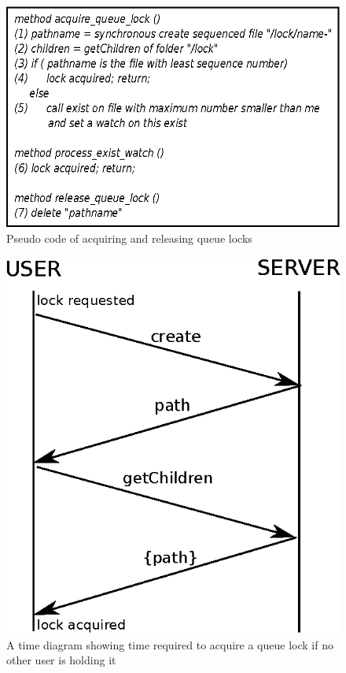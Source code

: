 \begin{figure}[h]
\centering
\includegraphics[scale=0.85]{img/queue_lock_pseudo.eps}
\caption{Pseudo code of acquiring and releasing queue locks}
\label{fig:queue_lock_pseudo}
\end{figure}

\begin{figure}[h]
\centering
\includegraphics[scale=0.85]{img/queue_lock_time.eps}
\caption{A time diagram showing time required to acquire a queue lock if no other user is holding it}
\label{fig:queue_lock_time}
\end{figure}


